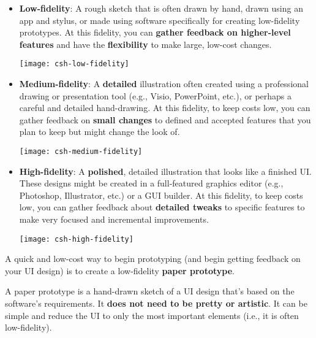 \begin{itemize}

\item{\textbf{Low-fidelity}: A rough sketch that is often drawn by hand, drawn using an app and stylus, or made using software specifically for creating low-fidelity prototypes. At this fidelity, you can \textbf{gather feedback on higher-level features} and have the \textbf{flexibility} to make large, low-cost changes.
\begin{center}
\texttt{[image: csh-low-fidelity]}
\end{center}\marginpar{\guiDef\margindivider}\marginpar{\lowFidelityPrototypeDef\margindivider}\marginpar{\mediumFidelityPrototypeDef}
\spacer
}
\item{\textbf{Medium-fidelity}: A \textbf{detailed} illustration often created using a professional drawing or presentation tool (e.g., Visio, PowerPoint, etc.), or perhaps a careful and detailed hand-drawing. At this fidelity, to keep costs low, you can gather feedback on \textbf{small changes} to defined and accepted features that you plan to keep but might change the look of.
\begin{center}
\texttt{[image: csh-medium-fidelity]}
\end{center}
}

\item{\textbf{High-fidelity}: A \textbf{polished}, detailed illustration that looks like a finished UI. These designs might be created in a full-featured graphics editor (e.g., Photoshop, Illustrator, etc.) or a GUI builder. At this fidelity, to keep costs low, you can gather feedback about \textbf{detailed tweaks} to specific features to make very focused and incremental improvements.

\marginpar{\highFidelityPrototypeDef\margindivider}\marginpar{\paperPrototypeDef}
\begin{center}
\texttt{[image: csh-high-fidelity]}
\end{center}
}
\end{itemize}

A quick and low-cost way to begin prototyping (and begin getting feedback on your UI design) is to create a low-fidelity \textbf{paper prototype}.

A paper prototype is a hand-drawn sketch of a UI design that's based on the software's requirements. It \textbf{does not need to be pretty or artistic}. It can be simple and reduce the UI to only the most important elements (i.e., it is often low-fidelity).

